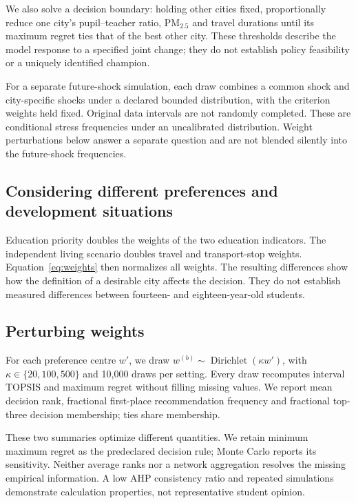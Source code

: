 \FutureDeterministic
We also solve a decision boundary: holding other cities fixed, proportionally
reduce one city's pupil--teacher ratio, PM$_{2.5}$ and travel durations until
its maximum regret ties that of the best other city. \FutureThresholds
These thresholds describe the model response to a specified joint change;
they do not establish policy feasibility or a uniquely identified champion.

For a separate future-shock simulation, each draw combines a common shock and
city-specific shocks under a declared bounded distribution, with the criterion
weights held fixed. Original data intervals are not randomly completed.
\FutureMonteCarlo
\ProxyWithdrawalMC
These are conditional stress frequencies under an uncalibrated distribution.
Weight perturbations below answer a separate question and are not blended
silently into the future-shock frequencies.

\subsection{Considering different preferences and development situations}
Education priority doubles the weights of the two education indicators.
The independent living scenario doubles travel and transport-stop weights.
Equation~\ref{eq:weights} then normalizes all weights.
\PreferenceResults
The resulting differences show how the definition of a desirable city affects
the decision. They do not establish measured differences between fourteen- and
eighteen-year-old students.

\subsection{Perturbing weights}
For each preference centre $w'$, we draw
$w^{(b)}\sim\operatorname{Dirichlet}(\kappa w')$, with
$\kappa\in\{20,100,500\}$ and 10,000 draws per setting. Every draw recomputes
interval TOPSIS and maximum regret without filling missing values. We report
mean decision rank, fractional first-place recommendation frequency and
fractional top-three decision membership; ties share membership.





\MonteCarloInterpretation
These two summaries optimize different quantities. We retain minimum maximum
regret as the predeclared decision rule; Monte Carlo reports its sensitivity.
Neither average ranks nor a network aggregation resolves the missing empirical
information. A low AHP consistency ratio and repeated simulations demonstrate
calculation properties, not representative student opinion.

